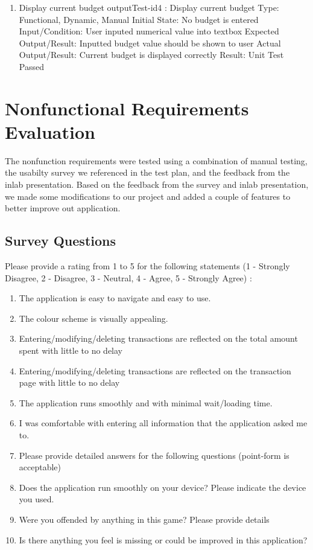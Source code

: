 \documentclass[12pt, titlepage]{article}
\begin{document}
\begin{enumerate}
\item{Display current budget}\label{A4}
outputTest-id4 : Display current budget
\newline
Type: Functional, Dynamic, Manual 
\newline
Initial State: No budget is entered
\newline
Input/Condition: User inputed numerical value into textbox
\newline
Expected Output/Result: Inputted budget value should be shown to user
\newline
Actual Output/Result: Current budget is displayed correctly
\newline
Result: Unit Test Passed
\end{enumerate}

\section{Nonfunctional Requirements Evaluation}
The nonfunction requirements were tested using a combination of manual testing, the usabilty survey we referenced in the test plan, and the feedback from the inlab presentation. Based on the feedback from the survey and inlab presentation, we made some modifications to our project and added a couple of features to better improve out application.

\subsection{Survey Questions}
 \label{survey:1}
Please provide a rating from 1 to 5 for the following statements (1 - Strongly Disagree, 2 - Disagree, 3 - Neutral, 4 - Agree, 5 - Strongly Agree) : 
\begin{enumerate}

\item The application is easy to navigate and easy to use. \label{question:q0}
\item The colour scheme is visually appealing.\label{question:q1}
\item Entering/modifying/deleting transactions are reflected on the total amount spent with little to no delay\label{question:q2}
\item Entering/modifying/deleting transactions are reflected on the transaction page with little to no delay\label{question:q3}
\item The application runs smoothly and with minimal wait/loading time.\label{question:q5}
\item I was comfortable with entering all information that the application asked me to.\label{question:q6}
\item Please provide detailed answers for the following questions (point-form is acceptable)\label{question:q7}
\item Does the application run smoothly on your device? Please indicate the device you used.\label{question:q8}
\item Were you offended by anything in this game? Please provide details\label{question:q9}
\item Is there anything you feel is missing or could be improved in this application?\label{question:q10}
\end{enumerate}
\end{document}
